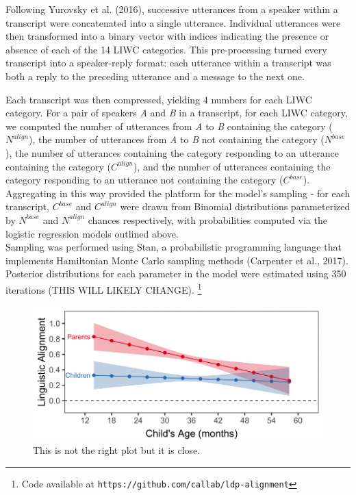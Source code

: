 \documentclass[10pt, letterpaper]{article}
\newenvironment{CodeChunk}{}{}
\begin{document}
Following Yurovsky et al. (2016), successive utterances from a speaker
within a transcript were concatenated into a single utterance.
Individual utterances were then transformed into a binary vector with
indices indicating the presence or absence of each of the 14 LIWC
categories. This pre-processing turned every transcript into a
speaker-reply format: each utterance within a transcript was both a
reply to the preceding utterance and a message to the next one.

Each transcript was then compressed, yielding 4 numbers for each LIWC
category. For a pair of speakers \emph{A} and \emph{B} in a transcript,
for each LIWC category, we computed the number of utterances from
\emph{A} to \emph{B} containing the category (\(N^{align}\)), the number
of utterances from \emph{A} to \emph{B} not containing the category
(\(N^{base}\)), the number of utterances containing the category
responding to an utterance containing the category (\(C^{align}\)), and
the number of utterances containing the category responding to an
utterance not containing the category (\(C^{base}\)). Aggregating in
this way provided the platform for the model's sampling - for each
transcript, \(C^{base}\) and \(C^{align}\) were drawn from Binomial
distributions parameterized by \(N^{base}\) and \(N^{align}\) chances
respectively, with probabilities computed via the logistic regression
models outlined above.\\
Sampling was performed using Stan, a probabilistic programming language
that implements Hamiltonian Monte Carlo sampling methods (Carpenter et
al., 2017). Posterior distributions for each parameter in the model were
estimated using 350 iterations (THIS WILL LIKELY CHANGE).
\footnote{Code available at \texttt{https://github.com/callab/ldp-alignment}}

\begin{CodeChunk}
\begin{figure}[h]

{\centering \includegraphics{figs/2-col-image-1} 

}

\caption[This is not the right plot but it is close]{This is not the right plot but it is close.}\label{fig:2-col-image}
\end{figure}
\end{CodeChunk}
\end{document}
